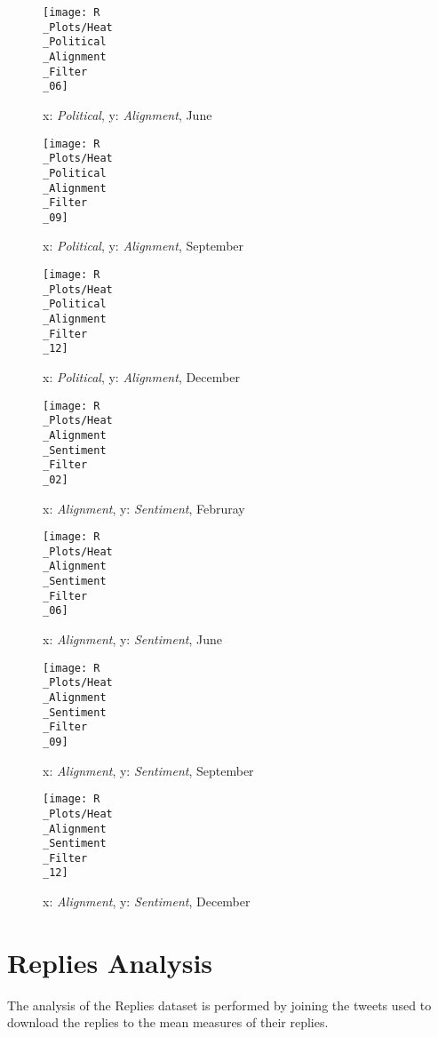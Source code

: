 \documentclass[twoside,twocolumn]{article}
\begin{document}
	\begin{figure}
		\texttt{[image: R\\\_Plots/Heat\\\_Political\\\_Alignment\\\_Filter\\\_06]}
		\caption{x: \textit{Political}, y: \textit{Alignment}, June}\label{fig:R_Heat_Political_Alignment_Filter_06}
	\end{figure}
	\begin{figure}
		\texttt{[image: R\\\_Plots/Heat\\\_Political\\\_Alignment\\\_Filter\\\_09]}
		\caption{x: \textit{Political}, y: \textit{Alignment}, September}\label{fig:R_Heat_Political_Alignment_Filter_09}
	\end{figure}
	\begin{figure}
		\texttt{[image: R\\\_Plots/Heat\\\_Political\\\_Alignment\\\_Filter\\\_12]}
		\caption{x: \textit{Political}, y: \textit{Alignment}, December}\label{fig:R_Heat_Political_Alignment_Filter_12}
	\end{figure}
	\begin{figure}
		\texttt{[image: R\\\_Plots/Heat\\\_Alignment\\\_Sentiment\\\_Filter\\\_02]}
		\caption{x: \textit{Alignment}, y: \textit{Sentiment}, Februray}\label{fig:R_Heat_Alignment_Sentiment_Filter_02}
	\end{figure}
	\begin{figure}
		\texttt{[image: R\\\_Plots/Heat\\\_Alignment\\\_Sentiment\\\_Filter\\\_06]}
		\caption{x: \textit{Alignment}, y: \textit{Sentiment}, June}\label{fig:R_Heat_Alignment_Sentiment_Filter_06}
	\end{figure}
	\begin{figure}
		\texttt{[image: R\\\_Plots/Heat\\\_Alignment\\\_Sentiment\\\_Filter\\\_09]}
		\caption{x: \textit{Alignment}, y: \textit{Sentiment}, September}\label{fig:R_Heat_Alignment_Sentiment_Filter_09}
	\end{figure}
	\begin{figure}
		\texttt{[image: R\\\_Plots/Heat\\\_Alignment\\\_Sentiment\\\_Filter\\\_12]}
		\caption{x: \textit{Alignment}, y: \textit{Sentiment}, December}\label{fig:R_Heat_Alignment_Sentiment_Filter_12}
	\end{figure}
	
	
	
	\newpage
	\section{Replies Analysis}
	The analysis of the Replies dataset is performed by joining the tweets used to download the replies to the mean measures of their replies.
	
\end{document}
